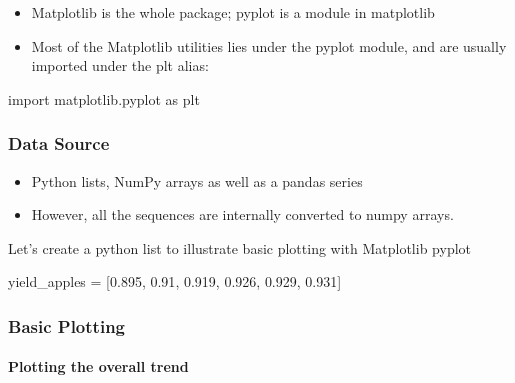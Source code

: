 \documentclass[
  letterpaper,
  DIV=11,
  numbers=noendperiod]{scrreprt}
\let\oldparagraph\paragraph
\renewcommand{\paragraph}[1]{\oldparagraph{#1}\mbox{}}
\newenvironment{Shaded}{\begin{snugshade}}{\end{snugshade}}
\newcommand{\FloatTok}[1]{\textcolor[rgb]{0.68,0.00,0.00}{#1}}
\newcommand{\ImportTok}[1]{\textcolor[rgb]{0.00,0.46,0.62}{#1}}
\newcommand{\NormalTok}[1]{\textcolor[rgb]{0.00,0.23,0.31}{#1}}
\newcommand{\OperatorTok}[1]{\textcolor[rgb]{0.37,0.37,0.37}{#1}}
\providecommand{\tightlist}{%
  \setlength{\itemsep}{0pt}\setlength{\parskip}{0pt}}\usepackage{longtable,booktabs,array}
\begin{document}
\begin{itemize}
\tightlist
\item
  Matplotlib is the whole package; pyplot is a module in matplotlib
\item
  Most of the Matplotlib utilities lies under the pyplot module, and are
  usually imported under the plt alias:
\end{itemize}

\begin{Shaded}
\begin{Highlighting}[]
\ImportTok{import}\NormalTok{ matplotlib.pyplot }\ImportTok{as}\NormalTok{ plt}
\end{Highlighting}
\end{Shaded}

\hypertarget{data-source}{%
\subsubsection{Data Source}\label{data-source}}

\begin{itemize}
\tightlist
\item
  Python lists, NumPy arrays as well as a pandas series
\item
  However, all the sequences are internally converted to numpy arrays.
\end{itemize}

Let's create a python list to illustrate basic plotting with Matplotlib
pyplot

\begin{Shaded}
\begin{Highlighting}[]
\NormalTok{yield\_apples }\OperatorTok{=}\NormalTok{ [}\FloatTok{0.895}\NormalTok{, }\FloatTok{0.91}\NormalTok{, }\FloatTok{0.919}\NormalTok{, }\FloatTok{0.926}\NormalTok{, }\FloatTok{0.929}\NormalTok{, }\FloatTok{0.931}\NormalTok{]}
\end{Highlighting}
\end{Shaded}

\hypertarget{basic-plotting}{%
\subsubsection{Basic Plotting}\label{basic-plotting}}

\hypertarget{plotting-the-overall-trend}{%
\paragraph{Plotting the overall
trend}\label{plotting-the-overall-trend}}
\end{document}

